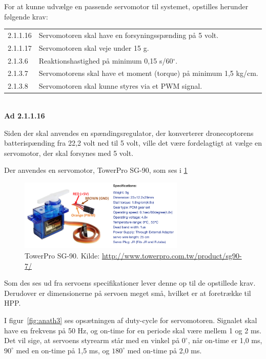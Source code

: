 For at kunne udvælge en passende servomotor til systemet, opstilles herunder følgende krav:\\
\vspace{1em}
\begin{tabular}[h]{ll}
2.1.1.16&Servomotoren skal have en forsyningsspænding på 5 volt.\vspace{0.5em}\\
2.1.1.17&Servomotoren skal veje under 15 g.\vspace{0.5em}\\
2.1.3.6 &Reaktionshastighed på minimum 0,15 s/60$^\circ$.\vspace{0.5em}\\
2.1.3.7& Servomotorens skal have et moment (torque) på minimum 1,5 kg/cm.\vspace{0.5em}\\
2.1.3.8& Servomotoren skal kunne styres via et PWM signal.\vspace{0.5em}\\ 
\end{tabular}
\vspace{1em}\\
\noindent \textbf{Ad 2.1.1.16}

\noindent Siden der skal anvendes en spændingsregulator, der konverterer dronecoptorens batterispænding fra 22,2 volt ned til 5 volt, ville det være fordelagtigt at vælge en servomotor, der skal forsynes med 5 volt.

Der anvendes en servomotor, TowerPro SG-90, som ses i \ref{fig:anath2}

\begin{figure}[h]
  \centering
  \includegraphics[width=0.7\textwidth]{./figurer/anath2.png}
  \caption{TowerPro SG-90. Kilde: \url{http://www.towerpro.com.tw/product/sg90-7/}}
  \label{fig:anath2}
\end{figure}

Som des ses ud fra servoens specifikationer lever denne op til de opstillede krav. Derudover er dimensionerne på servoen meget små, hvilket er at foretrække til HPP.

I figur~\ref{fig:anath3} ses opsætningen af duty-cycle for servomotoren. Signalet skal have en frekvens på 50 Hz, og on-time for en periode skal være mellem 1 og 2 ms. Det vil sige, at servoens styrearm står med en vinkel på $0^\circ$, når on-time er 1,0 ms, $90^\circ$ med en on-time på 1,5 ms, og $180^\circ$ med on-time på 2,0 ms. 

